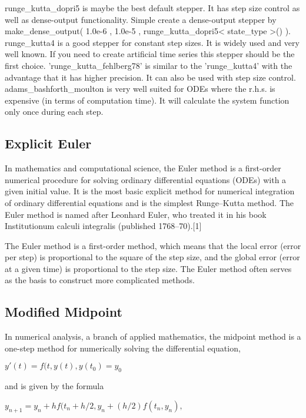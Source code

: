 runge\_kutta\_dopri5 is maybe the best default stepper. It has step size control as well as dense-output functionality. Simple create a dense-output stepper by make\_dense\_output( 1.0e-6 , 1.0e-5 , runge\_kutta\_dopri5< state\_type >() ). 
runge\_kutta4 is a good stepper for constant step sizes. It is widely used and very well known. If you need to create artificial time series this stepper should be the first choice. 
'runge\_kutta\_fehlberg78' is similar to the 'runge\_kutta4' with the advantage that it has higher precision. It can also be used with step size control. 
adams\_bashforth\_moulton is very well suited for ODEs where the r.h.s. is expensive (in terms of computation time). It will calculate the system function only once during each step. 



\subsection{Explicit Euler}
\label{Explicit Euler}

In mathematics and computational science, the Euler method is a first-order numerical procedure for solving ordinary differential equations (ODEs) with a given initial value. It is the most basic explicit method for numerical integration of ordinary differential equations and is the simplest Runge–Kutta method. The Euler method is named after Leonhard Euler, who treated it in his book Institutionum calculi integralis (published 1768–70).[1]

The Euler method is a first-order method, which means that the local error (error per step) is proportional to the square of the step size, and the global error (error at a given time) is proportional to the step size. The Euler method often serves as the basis to construct more complicated methods.





\subsection{Modified Midpoint}
\label{Modified Midpoint}

In numerical analysis, a branch of applied mathematics, the midpoint method is a one-step method for numerically solving the differential equation,

$y'(t)=f(t,y(t), y(t_0)=y_0$

and is given by the formula

$y_{n+1}=y_n + h f(t_n+h/2, y_n+ (h/2) f(t_n, y_n),$

